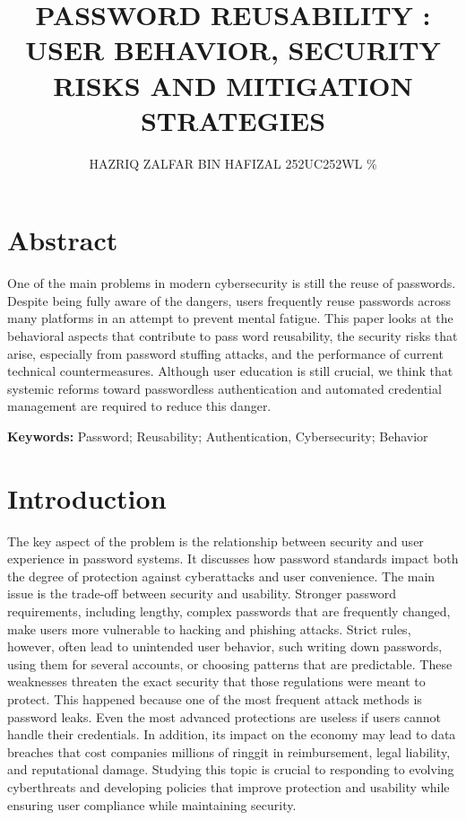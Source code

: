 \documentclass[a4paper, 12pt]{article}
\author{
HAZRIQ ZALFAR BIN HAFIZAL \quad 252UC252WL \quad 100\% \\
}
\title{PASSWORD REUSABILITY : USER BEHAVIOR,
SECURITY RISKS AND MITIGATION
STRATEGIES}
\date{}
\begin{document}
\maketitle

\section*{Abstract}
One of the main problems in modern cybersecurity is still the reuse of passwords. Despite being fully aware of the dangers, users frequently reuse passwords across many platforms in an attempt to prevent mental fatigue. This paper looks at the behavioral aspects that contribute to pass word reusability, the security risks that arise, especially from password stuffing attacks, and the performance of current technical countermeasures. Although user education is still crucial, we think that systemic reforms toward passwordless authentication and automated credential management are required to reduce this danger.

\vspace{0.8cm}

\textbf{Keywords:} Password; Reusability; Authentication, Cybersecurity; Behavior

\newpage

\tableofcontents

\newpage

\section{Introduction}
The key aspect of the problem is the relationship between security and user experience in password systems. It discusses how password standards impact both the degree of protection against cyberattacks and user convenience. The main issue is the trade-off between security and usability. Stronger password requirements, including lengthy, complex passwords that are frequently changed, make users more vulnerable to hacking and phishing attacks. Strict rules, however, often lead to unintended user behavior, such writing down passwords, using them for several accounts, or choosing patterns that are predictable. These weaknesses threaten the exact security that those regulations were meant to protect.
This happened because one of the most frequent attack methods is password leaks.
Even the most advanced protections are useless if users cannot handle their credentials. In addition, its impact on the economy may lead to data breaches that cost companies millions of ringgit in reimbursement, legal liability, and reputational damage. Studying this topic is crucial to responding to evolving cyberthreats and developing policies that improve protection and usability while ensuring user compliance while maintaining security.
\end{document}
